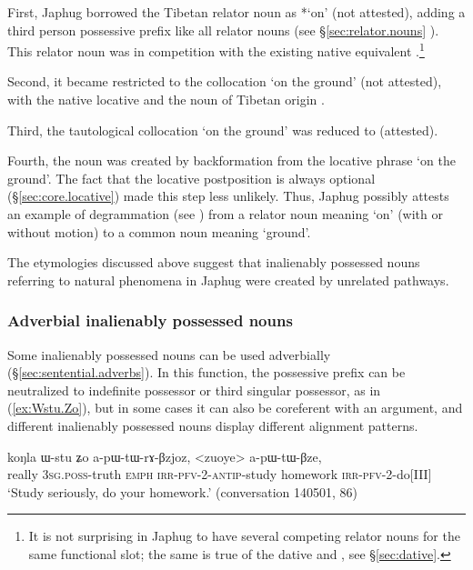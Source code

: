 First, Japhug borrowed the Tibetan relator noun   as  *`on' (not attested), adding a third person possessive prefix like all relator nouns (see §\ref{sec:relator.nouns} ). This relator noun was in competition with the existing native equivalent .\footnote{It is not surprising in Japhug to have several competing relator nouns for the same functional slot; the same is true of the dative  and , see §\ref{sec:dative}. }
  
 Second, it  became restricted to the collocation  `on the ground' (not attested), with the native locative  and the  noun of Tibetan origin .
  
Third, the tautological collocation  `on the ground' was reduced to  (attested).
 
Fourth, the noun  was created by backformation from the locative phrase  `on the ground'. The fact that the locative postposition  is always optional (§\ref{sec:core.locative}) made this step less unlikely.  Thus, Japhug possibly attests an example of degrammation (see \citealt[135]{norde09degrammaticalization}) from a relator noun meaning `on' (with or without motion) to a common noun meaning `ground'. 

The etymologies discussed above suggest that inalienably possessed nouns referring to natural phenomena in Japhug were created by unrelated pathways.

\subsubsection{Adverbial inalienably possessed nouns} \label{sec.IPN.adverbs}
Some inalienably possessed nouns can be used adverbially (§\ref{sec:sentential.adverbs}). In this function, the possessive prefix can be neutralized to indefinite possessor or third singular possessor, as  in (\ref{ex:Wstu.Zo}), but in some cases it can also be coreferent with an argument, and different inalienably possessed nouns display different alignment patterns.

\begin{exe}
\ex \label{ex:Wstu.Zo}
\gll koŋla ɯ-stu ʑo a-pɯ-tɯ-rɤ-βzjoz, <zuoye> a-pɯ-tɯ-βze, \\
really \textsc{3sg}.\textsc{poss}-truth \textsc{emph} \textsc{irr}-\textsc{pfv}-2-\textsc{antip}-study homework \textsc{irr}-\textsc{pfv}-2-do[III] \\
\glt `Study seriously, do your homework.' (conversation 140501, 86)
\end{exe}

